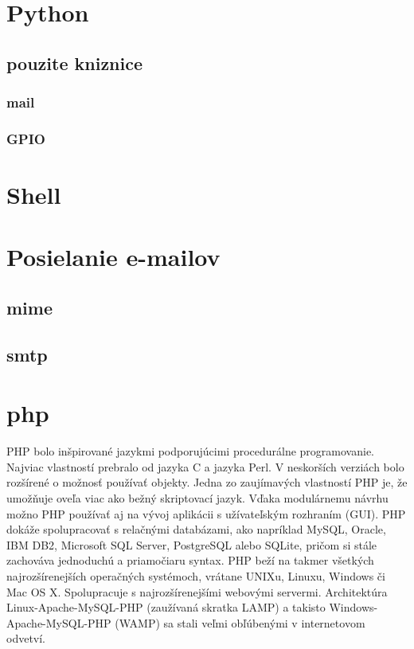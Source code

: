 \section{Python}
    \subsection{pouzite kniznice}
        \subsubsection{mail}
        \subsubsection{GPIO}
\section{Shell}
\section{Posielanie e-mailov}
\subsection{mime}
\subsection{smtp}
\section{php}
PHP bolo inšpirované jazykmi podporujúcimi procedurálne programovanie. Najviac vlastností prebralo od jazyka C a jazyka Perl. V neskorších verziách bolo rozšírené o možnosť používať objekty. Jedna zo zaujímavých vlastností PHP je, že umožňuje oveľa viac ako bežný skriptovací jazyk. Vďaka modulárnemu návrhu možno PHP používať aj na vývoj aplikácii s užívateľským rozhraním (GUI). PHP dokáže spolupracovať s relačnými databázami, ako napríklad MySQL, Oracle, IBM DB2, Microsoft SQL Server, PostgreSQL alebo SQLite, pričom si stále zachováva jednoduchú a priamočiaru syntax. PHP beží na takmer všetkých najrozšírenejších operačných systémoch, vrátane UNIXu, Linuxu, Windows či Mac OS X. Spolupracuje s najrozšírenejšími webovými servermi. Architektúra Linux-Apache-MySQL-PHP (zaužívaná skratka LAMP) a takisto Windows-Apache-MySQL-PHP (WAMP) sa stali veľmi obľúbenými v internetovom odvetví.
